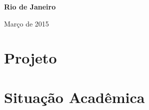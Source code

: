 \documentclass[a4paper,12pt,twoside]{article}
\begin{document}
\baselineskip 17pt

\vspace*{1.5cm}
\begin{center}
{{\bf Rio de Janeiro\par{Mar\c co de 2015}}}
\end{center}

\vspace*{.05cm}


\renewcommand{\thefootnote}{\arabic{footnote}}

\setcounter{footnote}{1}

\pagebreak

\baselineskip 19pt



\newpage
\section{Projeto}







\newpage
\section{Situação Acadêmica}
\end{document}
